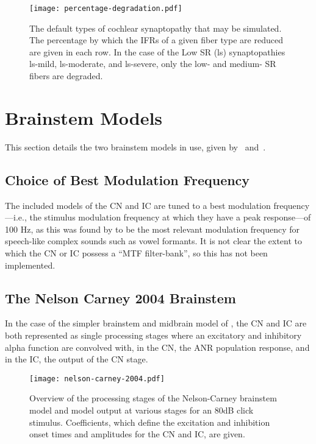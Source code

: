 \begin{figure}[htbp]
	\centering
	\texttt{[image: percentage-degradation.pdf]}
	\caption[Cochlear Synaptopathy Parameters]{The default types of cochlear synaptopathy that may be simulated. The percentage by which the IFRs of a given fiber type are reduced are given in each row.  In the case of the Low SR (ls) synaptopathies ls-mild, ls-moderate, and ls-severe, only the low- and medium- SR fibers are degraded.}
	\label{fig:synaptopathy}
\end{figure}

\section{Brainstem Models} %
\label{sec:brainstem_models}
This section details the two brainstem models in use, given by~\cite{Nelson2004Phenomenological} and~\cite{Carney2015Speech}.

\subsection{Choice of Best Modulation Frequency}
The included models of the CN and IC are tuned to a best modulation frequency---i.e., the stimulus modulation frequency at which they have a peak response---of 100 Hz, as this was found by \citeauthor{Carney2015Speech} to be the most relevant modulation frequency for speech-like complex sounds such as vowel formants.   It is not clear the extent to which the CN or IC possess a ``MTF filter-bank'', so this has not been implemented.

\subsection{The Nelson Carney 2004 Brainstem} %
In the case of the simpler brainstem and midbrain model of \citeauthor{Nelson2004Phenomenological}, the CN and IC are both represented as single processing stages where an excitatory and inhibitory alpha function are convolved with, in the CN, the ANR population response, and in the IC, the output of the CN stage. 
\label{sub:the_nelson_carney_2004_brainstem}
\begin{figure}[htbp]
	\centering
	\texttt{[image: nelson-carney-2004.pdf]}
	\caption[Overview of the Nelson-Carney Midbrain and Brainstem]{Overview of the processing stages of the Nelson-Carney brainstem model and model output at various stages for an 80dB click stimulus. Coefficients, which define the excitation and inhibition onset times and amplitudes for the CN and IC, are given. }
	\label{fig:nelson-carney}
\end{figure}
